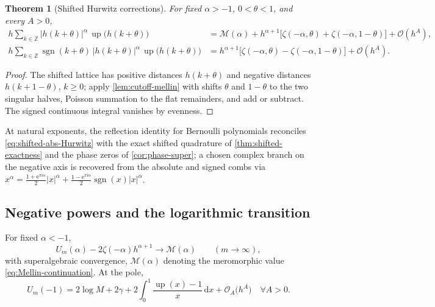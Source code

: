 \documentclass[11pt,oneside]{article}
\numberwithin{equation}{section}
\newtheorem{theorem}{Theorem}[section]
\theoremstyle{definition}
\theoremstyle{remark}
\newcommand{\Z}{\mathbb Z}
\newcommand{\dd}{\,\mathrm d}
\newcommand{\e}{\mathrm e}
\newcommand{\ii}{\mathrm i}
\newcommand{\Up}{\operatorname{up}}
\newcommand{\bigO}{\mathcal O}
\newcommand{\abs}[1]{\left\lvert #1\right\rvert}
\newcommand{\sgn}{\operatorname{sgn}}
\newcommand{\Mell}{\mathcal M}
\begin{document}
\begin{theorem}[Shifted Hurwitz corrections]
\label{thm:shifted-Hurwitz}
For fixed $\alpha>-1$, $0<\theta<1$, and every $A>0$,
\begin{align}
 h\sum_{k\in\Z}\abs{h(k+\theta)}^{\alpha}\,
 \Up\bigl(h(k+\theta)\bigr)
 &=\Mell(\alpha)
 +h^{\alpha+1}\bigl[\zeta(-\alpha,\theta)+\zeta(-\alpha,1-\theta)\bigr]
 +\bigO(h^{A}),
 \label{eq:shifted-abs-Hurwitz}\\
 h\sum_{k\in\Z}\sgn(k+\theta)\,\abs{h(k+\theta)}^{\alpha}\,
 \Up\bigl(h(k+\theta)\bigr)
 &=h^{\alpha+1}\bigl[\zeta(-\alpha,\theta)-\zeta(-\alpha,1-\theta)\bigr]
 +\bigO(h^{A}).
 \label{eq:shifted-signed-Hurwitz}
\end{align}
\end{theorem}

\begin{proof}
The shifted lattice has positive distances $h(k+\theta)$ and negative
distances $h(k+1-\theta)$, $k\ge0$; apply \cref{lem:cutoff-mellin}
with shifts $\theta$ and $1-\theta$ to the two singular halves,
Poisson summation to the flat remainders, and add or subtract.  The
signed continuous integral vanishes by evenness.
\end{proof}

At natural exponents, the reflection identity for Bernoulli
polynomials reconciles \eqref{eq:shifted-abs-Hurwitz} with the exact
shifted quadrature of \cref{thm:shifted-exactness} and the phase
zeros of \cref{cor:phase-super}; a chosen complex branch on the
negative axis is recovered from the absolute and signed combs via
$x^{\alpha}
=\tfrac{1+\e^{\pi\ii\alpha}}2\abs x^{\alpha}
+\tfrac{1-\e^{\pi\ii\alpha}}2\sgn(x)\abs x^{\alpha}$.

\subsection{Negative powers and the logarithmic transition}

\begin{proposition}
\label{prop:negative-powers}
For fixed $\alpha<-1$,
\begin{equation}
 U_m(\alpha)-2\zeta(-\alpha)h^{\alpha+1}
 \longrightarrow \Mell(\alpha)
 \qquad(m\to\infty),
 \label{eq:negative-renormalized}
\end{equation}
with superalgebraic convergence, $\Mell(\alpha)$ denoting the
meromorphic value \eqref{eq:Mellin-continuation}.  At the pole,
\begin{equation}
 \boxed{\;
 U_m(-1)
 =2\log M+2\gamma
 +2\int_0^1\frac{\Up(x)-1}{x}\dd x
 +\bigO_A\bigl(h^{A}\bigr)
 \quad\forall A>0.
 \;}
 \label{eq:critical-log}
\end{equation}
\end{proposition}
\end{document}
